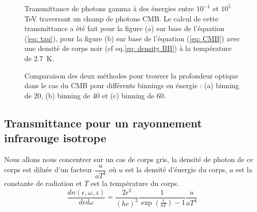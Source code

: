 \documentclass[a4paper,12pt,twoside]{article}
\begin{document}
\begin{figure}
	\centering
    \hfill
	\hfill
    \caption{Transmittance de photons gamma à des énergies entre $10^{-1}$ et $10^5$ \si{\TeV} traversant un champ de photons CMB. Le calcul de cette transmittance a été fait pour la figure (a) sur base de l'équation (\ref{eq: tau}), pour la figure (b) sur base de l'équation (\ref{eq: CMB}) avec une densité de corps noir (cf eq.\ref{eq: density BB}) à la température de \SI{2.7}{\K}.}
    \label{fig: 20K}
\end{figure}

\begin{figure}
	\centering
    \hfill
    \hfill
    \hfill
    \caption{Comparaison des deux méthodes pour trouver la profondeur optique dans le cas du CMB pour différents binnings en énergie : (a) binning de 20, (b) binning de 40 et (c) binning de 60.}
    \label{fig: CMB}
\end{figure}

\subsection{Transmittance pour un rayonnement infrarouge isotrope}

Nous allons nous concentrer sur un cas de corps gris, la densité de photon de ce corps est diluée d'un facteur $\dfrac{u}{a T^4}$ où $u$ est la densité d'énergie du corps, $a$ est la constante de radiation et $T$ est la température du corps.
\begin{equation}
	\frac{d n(\epsilon, \omega, z)}{d \epsilon d \omega} = \frac{2 \epsilon^2}{(h c)^3}\frac{1}{\exp\left(\frac{\epsilon}{kT}\right) - 1} \frac{u}{a T^4}
    \label{eq: IR}
\end{equation}
\end{document}
